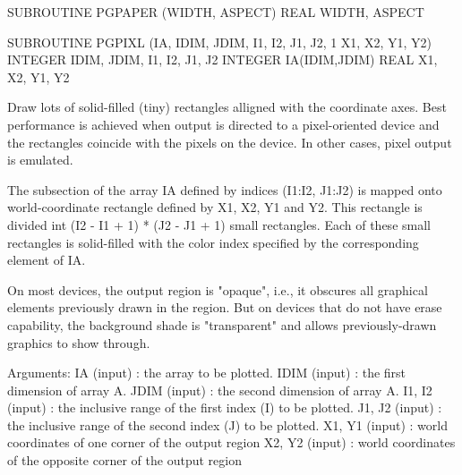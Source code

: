 {\eightpoint\begintt
      SUBROUTINE PGPAPER (WIDTH, ASPECT)
      REAL WIDTH, ASPECT
\endtt}

{\eightpoint\begintt
      SUBROUTINE PGPIXL (IA, IDIM, JDIM, I1, I2, J1, J2, 
     1                   X1, X2, Y1, Y2)
      INTEGER IDIM, JDIM, I1, I2, J1, J2
      INTEGER IA(IDIM,JDIM)
      REAL    X1, X2, Y1, Y2
 
Draw lots of solid-filled (tiny) rectangles alligned with the
coordinate axes. Best performance is achieved when output is
directed to a pixel-oriented device and the rectangles coincide
with the pixels on the device. In other cases, pixel output is
emulated.
 
The subsection of the array IA defined by indices (I1:I2, J1:J2)
is mapped onto world-coordinate rectangle defined by X1, X2, Y1
and Y2. This rectangle is divided int (I2 - I1 + 1) * (J2 - J1 + 1)
small rectangles. Each of these small rectangles is solid-filled
with the color index specified by the corresponding element of 
IA.
 
On most devices, the output region is "opaque", i.e., it obscures
all graphical elements previously drawn in the region. But on
devices that do not have erase capability, the background shade
is "transparent" and allows previously-drawn graphics to show
through.
 
 
Arguments:
 IA     (input)  : the array to be plotted.
 IDIM   (input)  : the first dimension of array A.
 JDIM   (input)  : the second dimension of array A.
 I1, I2 (input)  : the inclusive range of the first index
                   (I) to be plotted.
 J1, J2 (input)  : the inclusive range of the second
                   index (J) to be plotted.
 X1, Y1 (input)  : world coordinates of one corner of the output
                   region
 X2, Y2 (input)  : world coordinates of the opposite corner of the
                   output region
\endtt}

